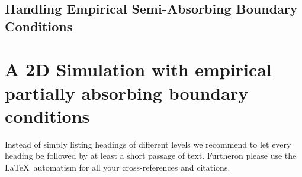 \subsection{Handling Empirical Semi-Absorbing Boundary Conditions}

\section{A 2D Simulation with empirical partially absorbing boundary conditions}
Instead of simply listing headings of different levels we recommend to let every heading be followed by at least a short passage of text. Furtheron please use the \LaTeX\ automatism for all your cross-references and citations.

